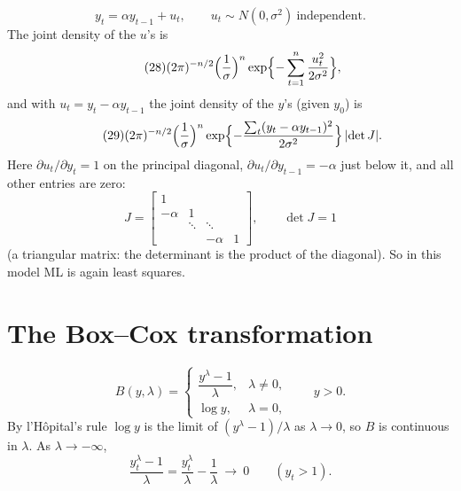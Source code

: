 \documentclass[11pt]{article}
\begin{document}
\begin{equation}\tag{27}
 y_{t}=\alpha y_{t-1}+u_{t}, \qquad u_{t}\sim N(0,\sigma^{2})\ \text{independent}.
\end{equation}
The joint density of the $u$'s is
\begin{equation}\tag{28}
 (2\pi)^{-n/2}\Bigl(\frac1\sigma\Bigr)^{n}\exp\Bigl\{-\sum_{t=1}^{n}\frac{u_{t}^{2}}{2\sigma^{2}}\Bigr\},
\end{equation}
and with $u_{t}=y_{t}-\alpha y_{t-1}$ the joint density of the $y$'s (given $y_{0}$) is
\begin{equation}\tag{29}
 (2\pi)^{-n/2}\Bigl(\frac1\sigma\Bigr)^{n}\exp\Bigl\{-\frac{\sum_{t}(y_{t}-\alpha y_{t-1})^{2}}{2\sigma^{2}}\Bigr\}\,\lvert\det J\rvert .
\end{equation}
Here $\partial u_{t}/\partial y_{t}=1$ on the principal diagonal, $\partial u_{t}/\partial y_{t-1}=-\alpha$ just below it,
and all other entries are zero:
\[ J=\begin{bmatrix}1&&&\\-\alpha&1&&\\&\ddots&\ddots&\\&&-\alpha&1\end{bmatrix},
   \qquad \det J=1 \]
(a triangular matrix: the determinant is the product of the diagonal). So in this model
ML is again least squares.

\section{The Box--Cox transformation}

\[ B(y,\lambda)=\begin{cases}\dfrac{y^{\lambda}-1}{\lambda}, & \lambda\neq0,\\[8pt] \log y, & \lambda=0,\end{cases}
   \qquad y>0 . \]
By l'H\^opital's rule $\log y$ is the limit of $(y^{\lambda}-1)/\lambda$ as $\lambda\to0$, so $B$ is continuous
in $\lambda$. As $\lambda\to-\infty$,
\begin{equation}\tag{30}
 \frac{y_{t}^{\lambda}-1}{\lambda}=\frac{y_{t}^{\lambda}}{\lambda}-\frac1\lambda\ \longrightarrow\ 0
 \qquad(y_{t}>1).
\end{equation}
\end{document}
